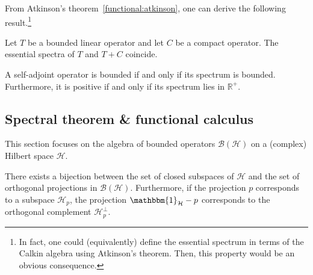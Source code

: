 
    From Atkinson's theorem~\ref{functional:atkinson}, one can derive the following result.\footnote{In fact, one could (equivalently) define the essential spectrum in terms of the Calkin algebra using Atkinson's theorem. Then, this property would be an obvious consequence.}
    \begin{property}
        Let $T$ be a bounded linear operator and let $C$ be a compact operator. The essential spectra of $T$ and $T+C$ coincide.
    \end{property}

    \begin{property}
        A self-adjoint operator is bounded if and only if its spectrum is bounded. Furthermore, it is positive if and only if its spectrum lies in $\mathbb{R}^+$.
    \end{property}

\subsection{Spectral theorem \& functional calculus}\label{section:PVM}

    This section focuses on the algebra of bounded operators $\mathcal{B}(\mathcal{H})$ on a (complex) Hilbert space $\mathcal{H}$.

    \begin{property}
        There exists a bijection between the set of closed subspaces of $\mathcal{H}$ and the set of orthogonal projections in $\mathcal{B}(\mathcal{H})$. Furthermore, if the projection $p$ corresponds to a subspace $\mathcal{H}_p$, the projection $\mathbbm{1}_{\mathcal{H}}-p$ corresponds to the orthogonal complement $\mathcal{H}_p^\perp$.
    \end{property}


